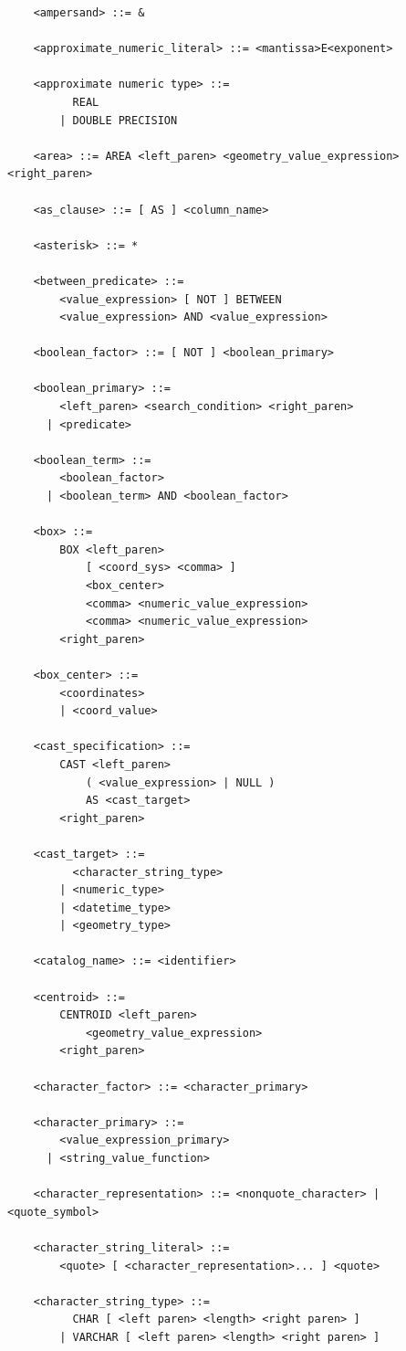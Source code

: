 \documentclass[11pt,a4paper]{ivoa}
\begin{document}
\begin{verbatim}
    <ampersand> ::= &

    <approximate_numeric_literal> ::= <mantissa>E<exponent>

    <approximate numeric type> ::=
          REAL
        | DOUBLE PRECISION

    <area> ::= AREA <left_paren> <geometry_value_expression> <right_paren>

    <as_clause> ::= [ AS ] <column_name>

    <asterisk> ::= *

    <between_predicate> ::=
        <value_expression> [ NOT ] BETWEEN
        <value_expression> AND <value_expression>

    <boolean_factor> ::= [ NOT ] <boolean_primary>

    <boolean_primary> ::=
        <left_paren> <search_condition> <right_paren>
      | <predicate>

    <boolean_term> ::=
        <boolean_factor>
      | <boolean_term> AND <boolean_factor>

    <box> ::=
        BOX <left_paren>
            [ <coord_sys> <comma> ]
            <box_center>
            <comma> <numeric_value_expression>
            <comma> <numeric_value_expression>
        <right_paren>
    
    <box_center> ::=
        <coordinates>
        | <coord_value>
    
    <cast_specification> ::=
        CAST <left_paren>
            ( <value_expression> | NULL )
            AS <cast_target>
        <right_paren>
    
    <cast_target> ::=
          <character_string_type>
        | <numeric_type>
        | <datetime_type>
        | <geometry_type>

    <catalog_name> ::= <identifier>

    <centroid> ::=
        CENTROID <left_paren>
            <geometry_value_expression>
        <right_paren>

    <character_factor> ::= <character_primary>

    <character_primary> ::=
        <value_expression_primary>
      | <string_value_function>

    <character_representation> ::= <nonquote_character> | <quote_symbol>

    <character_string_literal> ::=
        <quote> [ <character_representation>... ] <quote>

    <character_string_type> ::=
          CHAR [ <left paren> <length> <right paren> ]
        | VARCHAR [ <left paren> <length> <right paren> ]


\end{verbatim}
\end{document}

